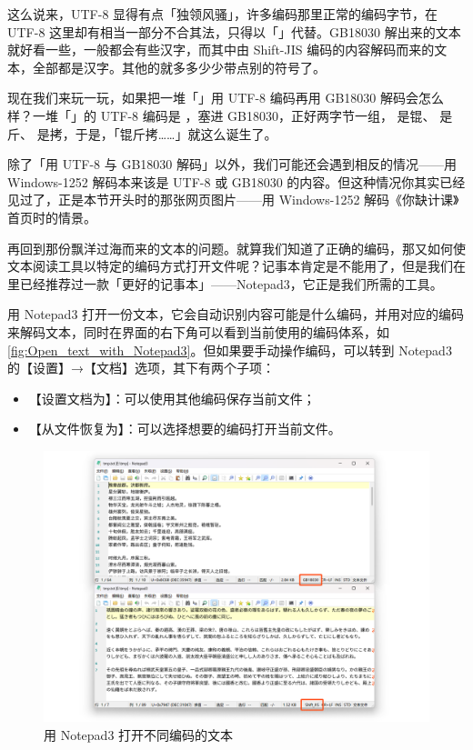 这么说来，UTF-8 显得有点「独领风骚」，许多编码那里正常的编码字节，在 UTF-8 这里却有相当一部分不合其法，只得以「\replacesymb{}」代替。GB18030 解出来的文本就好看一些，一般都会有些汉字，而其中由 Shift-JIS 编码的内容解码而来的文本，全部都是汉字。其他的就多多少少带点别的符号了。

现在我们来玩一玩，如果把一堆「\replacesymb{}」用 UTF-8 编码再用 GB18030 解码会怎么样？一堆「\replacesymb{}」的 UTF-8 编码是 ，塞进 GB18030，正好两字节一组， 是锟、 是斤、 是拷，于是，「锟斤拷……」就这么诞生了。

除了「用 UTF-8 与 GB18030 解码」以外，我们可能还会遇到相反的情况——用 Windows-1252 解码本来该是 UTF-8 或 GB18030 的内容。但这种情况你其实已经见过了，正是本节开头时的那张网页图片——用 Windows-1252 解码《你缺计课》首页时的情景。

再回到那份飘洋过海而来的文本的问题。就算我们知道了正确的编码，那又如何使文本阅读工具以特定的编码方式打开文件呢？记事本肯定是不能用了，但是我们在里已经推荐过一款「更好的记事本」——Notepad3，它正是我们所需的工具。

用 Notepad3 打开一份文本，它会自动识别内容可能是什么编码，并用对应的编码来解码文本，同时在界面的右下角可以看到当前使用的编码体系，如\autoref{fig:Open_text_with_Notepad3}。但如果要手动操作编码，可以转到 Notepad3 的【设置】→【文档】选项，其下有两个子项：

\begin{itemize}
  \item 【设置文档为】：可以使用其他编码保存当前文件；
  \item 【从文件恢复为】：可以选择想要的编码打开当前文件。
\end{itemize}

\begin{figure}[htb!]
  \centering
  \includegraphics[width=.75\textwidth]{assets/advanced/Notepad3.png}
  \caption{用 Notepad3 打开不同编码的文本}
  \label{fig:Open_text_with_Notepad3}
\end{figure}

